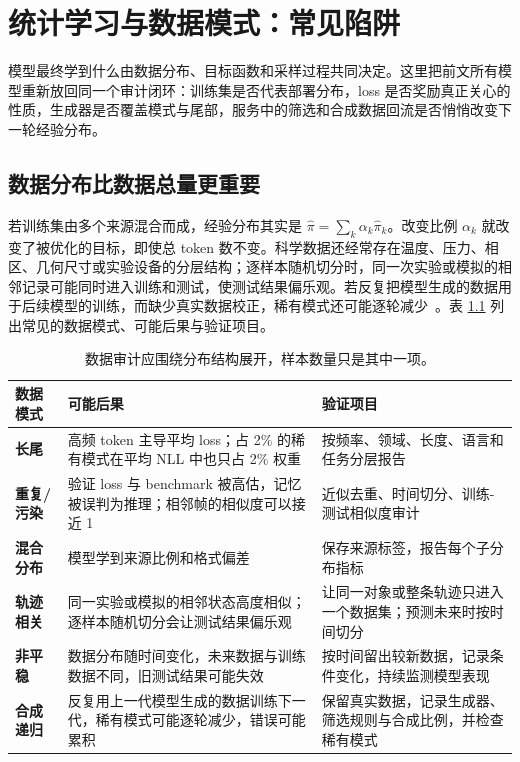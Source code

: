 \chapter{统计学习与数据模式：常见陷阱}
\label{chap:data-patterns}

\begin{keybox}[训练目标只看见经验分布]
模型最终学到什么由数据分布、目标函数和采样过程共同决定。这里把前文所有模型重新放回同一个审计闭环：训练集是否代表部署分布，loss 是否奖励真正关心的性质，生成器是否覆盖模式与尾部，服务中的筛选和合成数据回流是否悄悄改变下一轮经验分布。
\end{keybox}

\section{数据分布比数据总量更重要}

若训练集由多个来源混合而成，经验分布其实是 \(\hat\pi=\sum_k\alpha_k\hat\pi_k\)。改变比例 \(\alpha_k\) 就改变了被优化的目标，即使总 token 数不变。科学数据还经常存在温度、压力、相区、几何尺寸或实验设备的分层结构；逐样本随机切分时，同一次实验或模拟的相邻记录可能同时进入训练和测试，使测试结果偏乐观。若反复把模型生成的数据用于后续模型的训练，而缺少真实数据校正，稀有模式还可能逐轮减少~\cite{shumailov2024curse}。表 \ref{tab:data-patterns} 列出常见的数据模式、可能后果与验证项目。

\begin{table}[ht]
\centering\small
\begin{tabularx}{\textwidth}{>{\bfseries}p{29mm} X X}
\toprule
数据模式 & 可能后果 & 验证项目\\
\midrule
长尾 & 高频 token 主导平均 loss；占 2\% 的稀有模式在平均 NLL 中也只占 2\% 权重 & 按频率、领域、长度、语言和任务分层报告\\
重复/污染 & 验证 loss 与 benchmark 被高估，记忆被误判为推理；相邻帧的相似度可以接近 1 & 近似去重、时间切分、训练-测试相似度审计\\
混合分布 & 模型学到来源比例和格式偏差 & 保存来源标签，报告每个子分布指标\\
轨迹相关 & 同一实验或模拟的相邻状态高度相似；逐样本随机切分会让测试结果偏乐观 & 让同一对象或整条轨迹只进入一个数据集；预测未来时按时间切分\\
非平稳 & 数据分布随时间变化，未来数据与训练数据不同，旧测试结果可能失效 & 按时间留出较新数据，记录条件变化，持续监测模型表现\\
合成递归 & 反复用上一代模型生成的数据训练下一代，稀有模式可能逐轮减少，错误可能累积 & 保留真实数据，记录生成器、筛选规则与合成比例，并检查稀有模式\\
\bottomrule
\end{tabularx}
\caption{数据审计应围绕分布结构展开，样本数量只是其中一项。}
\label{tab:data-patterns}
\end{table}

